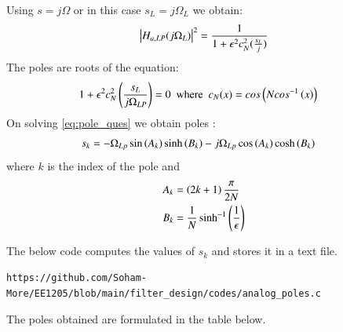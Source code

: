 \documentclass{article}
\begin{document}
\begin{enumerate}
Using $s=j\Omega$ or in this case $s_{L}=j\Omega_{L}$ we obtain:
\begin{align}
    \left\vert H_{a,LP}(j\Omega_L)\right\vert^2 = \frac{1}{1 + \epsilon^2c_N^2(\frac{s_L}{j})}
\end{align}
The poles are roots of the equation:
\begin{align}
    {1 + \epsilon^2c_N^2\ensuremath{\left(\frac{s_L}{j\Omega_{LP}}\right)}} &=0\hspace{5pt}\text{where}\hspace{5pt} c_N(x) = cos\left(Ncos^{-1}\left(x\right)\right) \label{eq:pole_ques}
\end{align}
On solving \eqref{eq:pole_ques} we obtain poles :
\begin{align}
    s_{k} &= -\Omega_{Lp} \sin\left(A_k\right)\sinh\left(B_k\right) - j\Omega_{Lp}\cos\left(A_k\right)\cosh\left(B_k\right)
\end{align}
where $k$ is the index of the pole and \\
\begin{align}
    A_k &= \left(2k+1\right)\frac{\pi}{2N}\\
    B_k &= \frac{1}{N} \sinh^{-1}\left(\frac{1}{\epsilon}\right)
\end{align}

The below code computes the values of $s_k$ and stores it in a text file.
\begin{lstlisting}
https://github.com/Soham-More/EE1205/blob/main/filter_design/codes/analog_poles.c
\end{lstlisting}
The poles obtained are formulated in the table below.



\end{enumerate}
\end{document}
